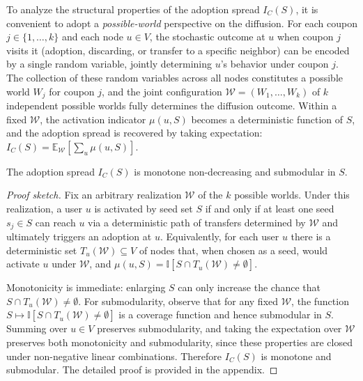 \documentclass{article}
\begin{document}
To analyze the structural properties of the adoption spread $I_C(S)$, it is convenient to adopt a \emph{possible-world} perspective on the diffusion. For each coupon $j \in \{1, \ldots, k\}$ and each node $u \in V$, the stochastic outcome at $u$ when coupon $j$ visits it (adoption, discarding, or transfer to a specific neighbor) can be encoded by a single random variable, jointly determining $u$'s behavior under coupon $j$. The collection of these random variables across all nodes constitutes a possible world $W_j$ for coupon $j$, and the joint configuration $\mathcal{W} = (W_1, \ldots, W_k)$ of $k$ independent possible worlds fully determines the diffusion outcome. Within a fixed $\mathcal{W}$, the activation indicator $\mu(u, S)$ becomes a deterministic function of $S$, and the adoption spread is recovered by taking expectation: $I_C(S) = \mathbb{E}_{\mathcal{W}}[\sum_u \mu(u, S)]$.

\begin{theorem}
\label{thm:monosub}
The adoption spread $I_C(S)$ is monotone non-decreasing and submodular in $S$.
\end{theorem}

\begin{proof}[Proof sketch]
Fix an arbitrary realization $\mathcal{W}$ of the $k$ possible worlds. Under this realization, a user $u$ is activated by seed set $S$ if and only if at least one seed $s_j \in S$ can reach $u$ via a deterministic path of transfers determined by $\mathcal{W}$ and ultimately triggers an adoption at $u$. Equivalently, for each user $u$ there is a deterministic set $T_u(\mathcal{W}) \subseteq V$ of nodes that, when chosen as a seed, would activate $u$ under $\mathcal{W}$, and $\mu(u, S) = \mathbb{I}[S \cap T_u(\mathcal{W}) \neq \emptyset]$.

Monotonicity is immediate: enlarging $S$ can only increase the chance that $S \cap T_u(\mathcal{W}) \neq \emptyset$. For submodularity, observe that for any fixed $\mathcal{W}$, the function $S \mapsto \mathbb{I}[S \cap T_u(\mathcal{W}) \neq \emptyset]$ is a coverage function and hence submodular in $S$. Summing over $u \in V$ preserves submodularity, and taking the expectation over $\mathcal{W}$ preserves both monotonicity and submodularity, since these properties are closed under non-negative linear combinations. Therefore $I_C(S)$ is monotone and submodular. The detailed proof is provided in the appendix.
\end{proof}
\end{document}
